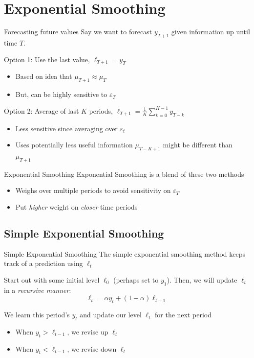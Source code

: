 \documentclass[aspectratio=169,t,11pt,table]{beamer}
\begin{document}
\section{Exponential Smoothing}

\begin{frame}{Forecasting future values}
  Say we want to forecast $y_{T+1}$ given information up until time $T$. 
  
  \bigskip
  {\color{green} Option 1:} Use the last value, $\ell_{T+1} = y_{T}$ 
  \begin{itemize}
    \item Based on idea that $\mu_{T+1} \approx \mu_T$
    \item But, can be highly sensitive to $\varepsilon_{T}$
  \end{itemize}

  \pause
  \bigskip
  {\color{green} Option 2:} Average of last $K$ periods, $\ell_{T+1} = \frac{1}{K} \sum_{k = 0}^{K-1} y_{T-k}$ 
  \begin{itemize}
    \item Less sensitive since averaging over $\varepsilon_{t}$
    
    \item Uses potentially less useful information $\mu_{T - K + 1}$ might be different than $\mu_{T + 1}$
  \end{itemize}
\end{frame}

\begin{frame}{Exponential Smoothing}
  Exponential Smoothing is a blend of these two methods
  \begin{itemize}
    \item Weighs over multiple periods to avoid sensitivity on $\varepsilon_T$ 
    
    \item Put \emph{higher} weight on \emph{closer} time periods 
  \end{itemize}
\end{frame}

\subsection{Simple Exponential Smoothing}

\begin{frame}{Simple Exponential Smoothing}
  The \alert{simple exponential smoothing} method keeps track of a prediction using $\ell_t$
  
  \bigskip
  Start out with some initial level $\ell_0$ (perhaps set to $y_1$).
  Then, we will update $\ell_t$ in a \emph{recursive manner}:
  $$
    \ell_{t} = \alpha y_t + (1 - \alpha) \ell_{t-1}
  $$
  

  We learn this period's $y_t$ and update our level $\ell_t$ for the next period
  
  \begin{itemize}
    \item When $y_t > \ell_{t-1}$, we revise up $\ell_{t}$ 
    
    \item When $y_t < \ell_{t-1}$, we revise down $\ell_{t}$ 
  \end{itemize}
\end{frame}
\end{document}
